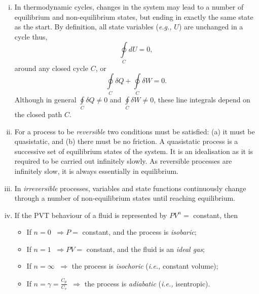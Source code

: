 \documentclass[12pts,a4paper,amsmath,amssymb,floatfix]{article}%
\newcommand{\frc}{\displaystyle\frac}
\newcommand{\eg}{{\it e.g., }}
\newcommand{\ie}{{\it i.e., }}
\begin{document}
\begin{enumerate}[i)]
This expression states that d$U$ is a total (\ie exact) differential for an infinitesimal transformation. $Q$ and $W$ are process-dependent and are not state functions, therefore $\delta Q$ and $\delta W$ are approximations (\ie not exact). 
%
      \item In thermodynamic cycles, changes in the system may lead to a number of equilibrium and non-equilibrium states, but ending in exactly the same state as the start. By definition, all state variables (\eg $U$) are unchanged in a cycle thus,
          \begin{displaymath}
             \displaystyle\oint\limits_{C} d U = 0,
          \end{displaymath}
around any closed cycle $C$, or
          \begin{displaymath}
             \displaystyle\oint\limits_{C} \delta Q + \displaystyle\oint\limits_{C} \delta W = 0.
          \end{displaymath}
Although in general $\displaystyle\oint\limits_{C} \delta Q\ne 0$ and $\displaystyle\oint\limits_{C} \delta W\ne 0$, these line integrals depend on the closed path $C$.
%
      \item For a process to be {\it reversible} two conditions must be satisfied: (a) it must be quasistatic, and (b) there must be no friction. A quasistatic process is a successive set of equilibrium states of the system. It is an idealisation as it is required to be carried out infinitely slowly. As reversible processes are infinitely slow, it is always essentially in equilibrium.
%
      \item In {\it irreversible} processes, variables and state functions continuously change through a number of non-equilibrium states until reaching equilibrium.
%
      \item If the PVT behaviour of a fluid is represented by $PV^{n}=$ constant, then
           \begin{itemize}
              \item If $n = 0\;\;\Longrightarrow P =$ constant, and the process is {\it isobaric}; 
              \item If $n = 1\;\;\Longrightarrow PV =$ constant, and the fluid is an {\it ideal gas};
              \item If $n = \infty\;\;\Longrightarrow$ the process is {\it isochoric} (\ie constant volume);
              \item If $n = \gamma=\frc{C_{p}}{C_{v}}\;\;\Longrightarrow$ the process is {\it adiabatic} (\ie isentropic).
           \end{itemize}
%
   \end{enumerate}
\end{document}
